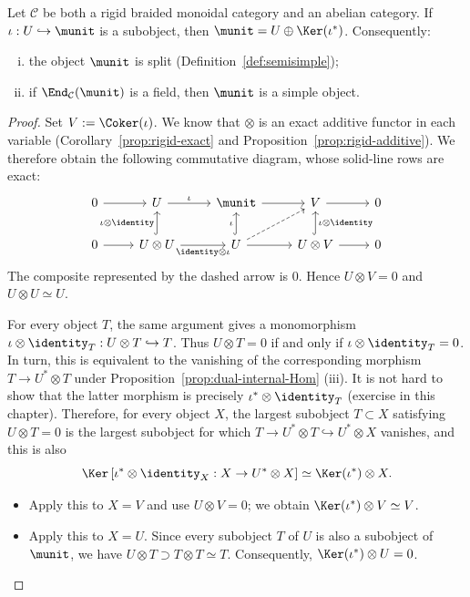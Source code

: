 \begin{proposition}\label{prop:rigid-unit-simple}
	Let $\mathcal{C}$ be both a rigid braided monoidal category and an abelian
category. If $\iota:U\hookrightarrow\munit$ is a subobject, then
$\munit=U\oplus\Ker(\iota^*)$. Consequently:
	\begin{enumerate}[(i)]
		\item the object $\munit$ is split (Definition~\ref{def:semisimple});
		\item if $\End_{\mathcal{C}}(\munit)$ is a field, then $\munit$ is a
		simple object.
	\end{enumerate}
\end{proposition}
\begin{proof}
	Set $V:=\Coker(\iota)$. We know that $\otimes$ is an exact additive functor
in each variable (Corollary~\ref{prop:rigid-exact} and
Proposition~\ref{prop:rigid-additive}). We therefore obtain the following
commutative diagram, whose solid-line rows are exact:
	\[\begin{tikzcd}
		0 \arrow[r] & U \arrow[r, "\iota"] & \munit \arrow[r] & V \arrow[r] & 0 \\
		0 \arrow[r] & U \otimes U \arrow[hookrightarrow, u, "{\iota \otimes \identity}"] \arrow[r, "{\identity \otimes \iota}"'] & U \arrow[hookrightarrow, u, "\iota"] \arrow[r] \arrow[dashed, ru] & U \otimes V \arrow[hookrightarrow, u, "{\iota \otimes \identity}"'] \arrow[r] & 0
	\end{tikzcd}\]
	The composite represented by the dashed arrow is $0$. Hence
$U\otimes V=0$ and $U\otimes U\simeq U$.

	For every object $T$, the same argument gives a monomorphism
$\iota\otimes\identity_T:U\otimes T\hookrightarrow T$. Thus
$U\otimes T=0$ if and only if $\iota\otimes\identity_T=0$. In turn, this is
equivalent to the vanishing of the corresponding morphism
$T\to U^*\otimes T$ under Proposition~\ref{prop:dual-internal-Hom} (iii).
It is not hard to show that the latter morphism is precisely
$\iota^*\otimes\identity_T$ (exercise in this chapter). Therefore, for every
object $X$, the largest subobject $T\subset X$ satisfying $U\otimes T=0$
is the largest subobject for which
$T\to U^*\otimes T\hookrightarrow U^*\otimes X$ vanishes, and this is also
	\[ \Ker\left[ \iota^* \otimes \identity_X: X \to U^* \otimes X \right] \simeq \Ker(\iota^*) \otimes X. \]
	\begin{itemize}
		\item Apply this to $X=V$ and use $U\otimes V=0$; we obtain
		$\Ker(\iota^*)\otimes V\simeq V$.
		\item Apply this to $X=U$. Since every subobject $T$ of $U$ is also a
		subobject of $\munit$, we have $U\otimes T\supset T\otimes T\simeq T$.
		Consequently, $\Ker(\iota^*)\otimes U=0$.
	\end{itemize}


\end{proof}
